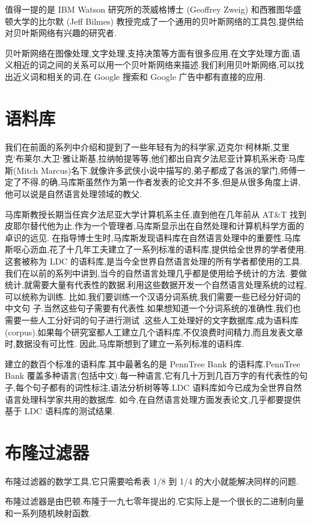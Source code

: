 \documentclass{article}
\begin{document}
值得一提的是 IBM Watson 研究所的茨威格博士 (Geoffrey Zweig) 和西雅图华盛顿大学的比尔默 (Jeff Bilmes) 教授完成了一个通用的贝叶斯网络的工具包,提供给对贝叶斯网络有兴趣的研究者.

贝叶斯网络在图像处理,文字处理,支持决策等方面有很多应用.在文字处理方面,语义相近的词之间的关系可以用一个贝叶斯网络来描述.我们利用贝叶斯网络,可以找出近义词和相关的词,在 Google 搜索和 Google 广告中都有直接的应用.

\section{语料库}
我们在前面的系列中介绍和提到了一些年轻有为的科学家,迈克尔`柯林斯,艾里克`布莱尔,大卫`雅让斯基,拉纳帕提等等,他们都出自宾夕法尼亚计算机系米奇`马库斯(Mitch Marcus)名下.就像许多武侠小说中描写的,弟子都成了各派的掌门,师傅一定了不得.的确,马库斯虽然作为第一作者发表的论文并不多,但是从很多角度上讲,他可以说是自然语言处理领域的教父. 

马库斯教授长期当任宾夕法尼亚大学计算机系主任,直到他在几年前从 AT&T 找到皮耶尔替代他为止.作为一个管理者,马库斯显示出在自然处理和计算机科学方面的卓识的远见.
在指导博士生时,马库斯发现语料库在自然语言处理中的重要性.马库斯呕心沥血,花了十几年工夫建立了一系列标准的语料库,提供给全世界的学者使用.
这套被称为 LDC 的语料库,是当今全世界自然语言处理的所有学者都使用的工具.我们在以前的系列中讲到,当今的自然语言处理几乎都是使用给予统计的方法.
要做统计,就需要大量有代表性的数据.利用这些数据开发一个自然语言处理系统的过程,可以统称为训练.
比如,我们要训练一个汉语分词系统,我们需要一些已经分好词的中文句 子.当然这些句子需要有代表性.如果想知道一个分词系统的准确性,我们也需要一些人工分好词的句子进行测试
.这些人工处理好的文字数据库,成为语料库 (corpus).如果每个研究室都人工建立几个语料库,不仅浪费时间精力,而且发表文章时,数据没有可比性.
因此,马库斯想到了建立一系列标准的语料库.

建立的数百个标准的语料库.其中最著名的是 PennTree Bank 的语料库.PennTree Bank 覆盖多种语言(包括中文).每一种语言,它有几十万到几百万字的有代表性的句子,每个句子都有的词性标注,语法分析树等等.LDC 语料库如今已成为全世界自然语言处理科学家共用的数据库.
如今,在自然语言处理方面发表论文,几乎都要提供基于 LDC 语料库的测试结果.

\section{布隆过滤器}
布隆过滤器的数学工具,它只需要哈希表 1/8 到 1/4 的大小就能解决同样的问题.

布隆过滤器是由巴顿.布隆于一九七零年提出的.它实际上是一个很长的二进制向量和一系列随机映射函数.
\end{document}
